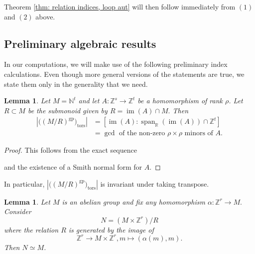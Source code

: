 \documentclass{article}
\newtheorem{lemma}[definition]{Lemma}
\newcommand{\gr}{\mathrm{gr}}
\begin{document}
Theorem \ref{thm: relation indices, loop aut} will then follow immediately from $(1)$ and $(2)$ above.

\subsection{Preliminary algebraic results}

In our computations, we will make use of the following preliminary index calculations. Even though more general versions of the statements are true, we state them only in the generality that we need. 

\begin{lemma} \label{lem:gcd}
Let $M = \mathbb{N}^t$ and let 
$
A \colon \mathbb{Z}^s \longrightarrow \mathbb{Z}^t
$
be a homomorphism of rank $\rho$. Let $R \subset M$ be the submonoid given by
$
R = \operatorname{im}(A) \cap M.
$
Then
\begin{align*}
\left| \bigl((M/R)^{\mathrm{gp}}\bigr)_{\mathrm{tors}} \right|
& = [\operatorname{im}(A): \operatorname{span}_{\mathbb{R}}(\operatorname{im}(A)) \cap \mathbb{Z}^t] \\
&= \gcd \text{ of the non-zero } \rho \times \rho \text{ minors of } A.
\end{align*}

  
\end{lemma}

\begin{proof}
    This follows from the exact sequence
    \begin{center}
    \end{center}
    and the existence of a Smith normal form for $A$. 
\end{proof}

In particular, $\left| \bigl((M/R)^{\mathrm{gp}}\bigr)_{\mathrm{tors}} \right|$ is invariant under taking transpose. 

\begin{lemma} \label{lem: unconstrained}
    Let $M$ is an abelian group and fix any homomorphism $\alpha: \mathbb{Z}^r \rightarrow M.$
    Consider 
    $$N = (M \times \mathbb{Z}^r)/R$$
    where the relation $R$ is generated by the image of 
    $$\mathbb{Z}^r \rightarrow M \times \mathbb{Z}^r, m \mapsto (\alpha(m),m).$$
    Then $N \simeq M$. 
\end{lemma}
\end{document}
